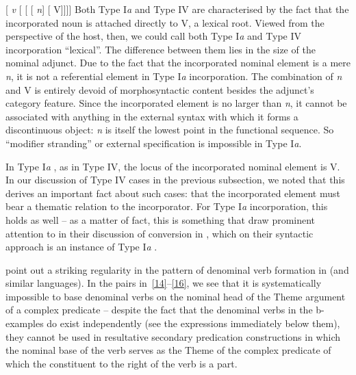 \documentclass[output=paper]{langsci/langscibook}
\begin{document}
\begin{refcontext}
\ea  {}[ \emph{v}\tss{\{[+V], \Acc{}, \ldots{}\}} [
[ [ \hspace{-.7ex}\emph{n}\tss{\{[+N]\}}] [ \hspace{-.7ex}V]]]]\label{13}
\z
Both Type I\emph{a} and Type IV  are characterised by the
fact that the incorporated noun is attached directly to V, a lexical root.
Viewed from the perspective of the host, then, we could call both Type
I\emph{a} and Type IV incorporation \enquote{lexical}. The difference between
them lies in the size of the nominal adjunct. Due to the fact that the
incorporated nominal element is a mere \emph{n}, it is not a referential
element in Type I\emph{a} incorporation. The combination of \emph{n} and V is
entirely devoid of morphosyntactic content besides the adjunct's category
feature. Since the incorporated element is no larger than \emph{n}, it cannot
be associated with anything in the external syntax with which it forms a
discontinuous object: \emph{n} is itself the lowest point in the functional
sequence. So \enquote{modifier stranding} or external specification is
impossible in Type I\emph{a}.

In Type I\emph{a} , as in Type IV, the locus of the
incorporated nominal element is V. In our discussion of Type IV cases in the
previous subsection, we noted that this derives an important fact about such
cases: that the incorporated element must bear a thematic relation to the
incorporator. For Type I\emph{a} incorporation, this holds as well -- as a
matter of fact, this is something that \citet{halekeyser} draw prominent
attention to in their discussion of conversion in , which on their
syntactic approach is an instance of Type I\emph{a} .

\citet{halekeyser} point out a striking regularity in the pattern of denominal
verb formation in  (and similar languages). In the pairs
in~\eqref{14}--\eqref{16}, we see that it is systematically impossible to base
denominal verbs on the nominal head of the Theme argument of a complex
predicate -- despite the fact that the denominal verbs in the b-examples do
exist independently (see the expressions immediately below them), they cannot
be used in resultative secondary predication constructions in which the nominal
base of the verb serves as the Theme of the complex predicate of which the
constituent to the right of the verb is a part.

\ea \label{14}
    \z
\z


\end{refcontext}
\end{document}
